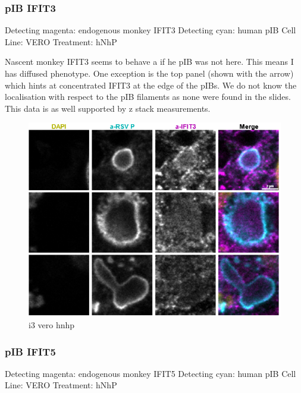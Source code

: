 \subsubsection{pIB IFIT3}
Detecting magenta: endogenous monkey IFIT3 \newline
Detecting cyan: human pIB \newline
Cell Line: VERO \newline
Treatment: hNhP \newline

Nascent monkey IFIT3 seems to behave a if he pIB was not here. This means I has diffused phenotype. One exception is the top panel (shown with the arrow) which hints at concentrated IFIT3 at the edge of the pIBs. We do not know the localisation with respect to the pIB filaments as none were found in the slides. This data is as well supported by z stack measurements.

\begin{figure}
    \centering
    \includegraphics[width=1\linewidth]{09. Chapter 4/Figs/03. pIB/04. i3 vero hnhp.png}
    \caption[i3 vero hnhp]{i3 vero hnhp}
    \label{fig:i3 vero hnhp}
\end{figure}

\subsubsection{pIB IFIT5}
Detecting magenta: endogenous monkey IFIT5 \newline
Detecting cyan: human pIB \newline
Cell Line: VERO \newline
Treatment: hNhP \newline

